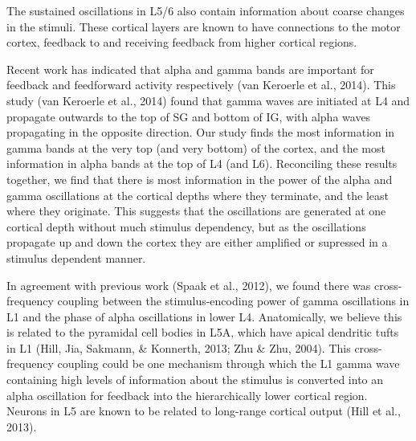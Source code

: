 The sustained oscillations in \acs{L5}/6 also contain information about coarse changes in the stimuli. These cortical layers are known to have connections to the motor cortex, feedback to  and receiving feedback from higher cortical regions. 

Recent work has indicated that alpha and gamma bands are important for feedback and feedforward activity respectively (van Keroerle et al., 2014). This study (van Keroerle et al., 2014) found that gamma waves are initiated at \ac{L4} and propagate outwards to the top of \ac{SG} and bottom of \ac{IG}, with alpha waves propagating in the opposite direction. Our study finds the most information in gamma bands at the very top (and very bottom) of the cortex, and the most information in alpha bands at the top of \ac{L4} (and \ac{L6}). Reconciling these results together, we find that there is most information in the power of the alpha and gamma oscillations at the cortical depths where they terminate, and the least where they originate. This suggests that the oscillations are generated at one cortical depth without much stimulus dependency, but as the oscillations propagate up and down the cortex they are either amplified or supressed in a stimulus dependent manner.

In agreement with previous work (Spaak et al., 2012), we found there was cross-frequency coupling between the stimulus-encoding power of gamma oscillations in \ac{L1} and the phase of alpha oscillations in lower \ac{L4}. Anatomically, we believe this is related to the pyramidal cell bodies in \ac{L5A}, which have apical dendritic tufts in \ac{L1} (Hill, Jia, Sakmann, \& Konnerth, 2013; Zhu \& Zhu, 2004). This cross-frequency coupling could be one mechanism through which the \ac{L1} gamma wave containing high levels of information about the stimulus is converted into an alpha oscillation for feedback into the hierarchically lower cortical region. Neurons in \ac{L5} are known to be related to long-range cortical output (Hill et al., 2013). 

